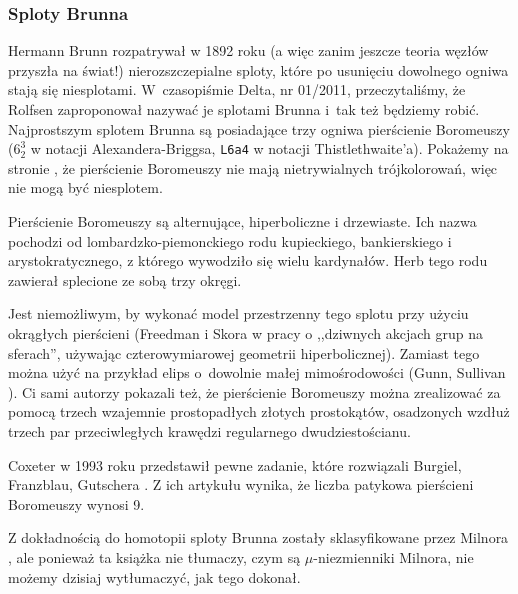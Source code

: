 %

\subsubsection{Sploty Brunna}
%
Hermann Brunn \cite{brunn1892} rozpatrywał w 1892 roku (a więc zanim jeszcze teoria węzłów przyszła na świat!) nierozszczepialne sploty, które po usunięciu dowolnego ogniwa stają się niesplotami.
%
W~czasopiśmie Delta, nr 01/2011, przeczytaliśmy, że Rolfsen zaproponował nazywać je splotami Brunna i~tak też będziemy robić.
Najprostszym splotem Brunna są posiadające trzy ogniwa pierścienie Boromeuszy ($6_2^3$ w notacji Alexandera-Briggsa, \texttt{L6a4} w notacji Thistlethwaite'a).
%
Pokażemy na stronie \pageref{boromean_not_splittable}, że pierścienie Boromeuszy nie mają nietrywialnych trójkolorowań, więc nie mogą być niesplotem.

Pierścienie Boromeuszy są alternujące, hiperboliczne i drzewiaste.
%
%
%
%
Ich nazwa pochodzi od lombardzko-piemonckiego rodu kupieckiego, bankierskiego i arystokratycznego, z którego wywodziło się wielu kardynałów.
Herb tego rodu zawierał splecione ze sobą trzy okręgi.

Jest niemożliwym, by wykonać model przestrzenny tego splotu przy użyciu okrągłych pierścieni (Freedman i Skora \cite[lemat 3.2]{freedman1987} w pracy o ,,dziwnych akcjach grup na sferach'', używając czterowymiarowej geometrii hiperbolicznej).
%
%
Zamiast tego można użyć na przykład elips o~dowolnie małej mimośrodowości (Gunn, Sullivan \cite{gunn2008}).
%
%
Ci sami autorzy pokazali też, że pierścienie Boromeuszy można zrealizować za pomocą trzech wzajemnie prostopadłych złotych prostokątów, osadzonych wzdłuż trzech par przeciwległych krawędzi regularnego dwudziestościanu.

Coxeter w 1993 roku przedstawił pewne zadanie, które rozwiązali Burgiel, Franzblau, Gutschera \cite{burgiel1996}.
Z ich artykułu wynika, że liczba patykowa pierścieni Boromeuszy wynosi 9.
%
%
%

Z dokładnością do homotopii sploty Brunna zostały sklasyfikowane przez Milnora \cite{milnor1954}, ale ponieważ ta książka nie tłumaczy, czym są $\mu$-niezmienniki Milnora, nie możemy dzisiaj wytłumaczyć, jak tego dokonał.
%
%

%